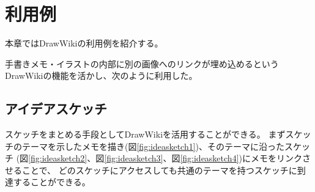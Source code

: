 \chapter{利用例}
\label{chap:riyourei}

本章ではDrawWikiの利用例を紹介する。

\newpage

手書きメモ・イラストの内部に別の画像へのリンクが埋め込めるというDrawWikiの機能を活かし、次のように利用した。

\section{アイデアスケッチ}
\label{drawiki:normalmemo}
スケッチをまとめる手段としてDrawWikiを活用することができる。
まずスケッチのテーマを示したメモを描き(図\ref{fig:ideasketch1})、そのテーマに沿ったスケッチ
(図\ref{fig:ideasketch2}、図\ref{fig:ideasketch3}、図\ref{fig:ideasketch4})にメモをリンクさせることで、
どのスケッチにアクセスしても共通のテーマを持つスケッチに到達することができる。
